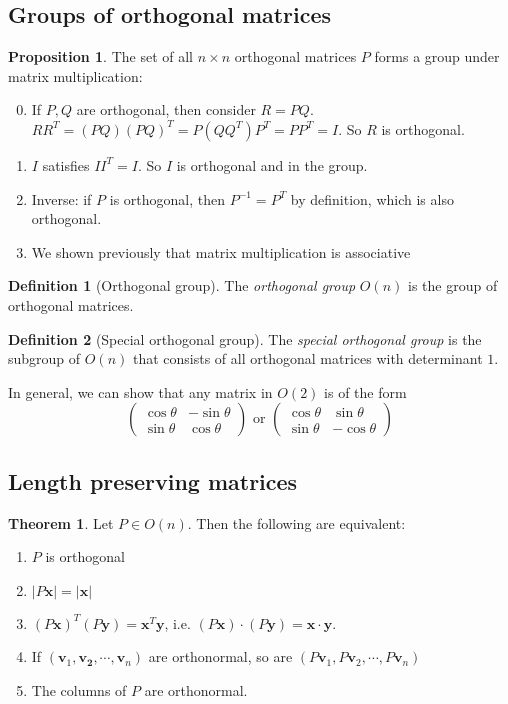 \documentclass[a4paper]{article}
\theoremstyle{definition}
\newtheorem*{prop}{Proposition}
\newtheorem*{thm}{Theorem}
\newtheorem*{defi}{Definition}
\newcommand{\mb}[1]{\mathbf{#1}}
\begin{document}
\subsection{Groups of orthogonal matrices}
\begin{prop}
  The set of all $n\times n$ orthogonal matrices $P$ forms a group under matrix multiplication:
  \begin{enumerate}[label=\arabic{*}.]
    \setcounter{enumi}{-1}
  \item If $P, Q$ are orthogonal, then consider $R = PQ$. $RR^T = (PQ)(PQ)^T = P(QQ^T)P^T = PP^T = I$. So $R$ is orthogonal.
  \item $I$ satisfies $II^T = I$. So $I$ is orthogonal and in the group.
  \item Inverse: if $P$ is orthogonal, then $P^{-1}=P^T$ by definition, which is also orthogonal.
  \item We shown previously that matrix multiplication is associative
  \end{enumerate}
\end{prop}

\begin{defi}[Orthogonal group]
  The \emph{orthogonal group} $O(n)$ is the group of orthogonal matrices.
\end{defi}

\begin{defi}[Special orthogonal group]
  The \emph{special orthogonal group} is the subgroup of $O(n)$ that consists of all orthogonal matrices with determinant $1$.
\end{defi}

In general, we can show that any matrix in $O(2)$ is of the form
\[
\begin{pmatrix}
  \cos\theta & -\sin\theta\\
  \sin\theta & \cos\theta
\end{pmatrix}\text{ or }
\begin{pmatrix}
  \cos\theta & \sin\theta\\
  \sin\theta & -\cos\theta
\end{pmatrix}
\]
\subsection{Length preserving matrices}
\begin{thm}
  Let $P\in O(n)$. Then the following are equivalent:
  \begin{enumerate}
    \item $P$ is orthogonal
    \item $|P\mb{x}| = |\mb{x}|$
    \item $(P\mb{x})^T(P\mb{y}) = \mb{x}^T\mb{y}$, i.e. $(P\mb{x})\cdot(P\mb{y}) = \mb{x}\cdot \mb{y}$.
    \item If $(\mb{v}_1, \mb{v_2}, \cdots, \mb{v}_n)$ are orthonormal, so are $(P\mb{v}_1, P\mb{v}_2, \cdots, P\mb{v}_n)$
    \item The columns of $P$ are orthonormal. 
  \end{enumerate}
\end{thm}
\end{document}
